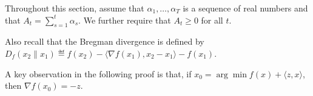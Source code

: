 \documentclass{article}
\begin{document}
 

Throughout this section, assume that $\alpha_1,\ldots,\alpha_T$ is 
a sequence of real numbers and that $A_t = \sum_{s=1}^t \alpha_s$. 
We further require that $A_t \geq 0$ for all $t$.

Also recall that the Bregman divergence is defined by $D_f(x_2 \| x_1) \eqdef f(x_2) - \langle \nabla f(x_1), x_2-x_1 \rangle - f(x_1)$.

A key observation in the following proof is that, if $x_0 = \arg\min f(x) + \langle z, x \rangle$, then $\nabla f(x_0) = -z$.

\end{document}

